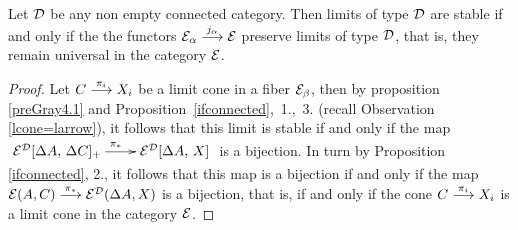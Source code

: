 \begin{proposition} \label{stable=preserve}
Let $\mathcal{D}$ be any non empty connected category. Then limits of type 
$\mathcal{D}$ are stable if and only if the  the functors 
$\mathcal{E}_\alpha \overset {j_\alpha} {\longrightarrow} \mathcal{E}$ preserve limits of type $\mathcal{D}$, that is, they remain universal in the category $\mathcal{E}$.
\end{proposition}
\begin{proof}
Let 
$C \overset {\pi_i} {\longrightarrow} X_i$ be a limit cone  
in a fiber $\mathcal{E}_\beta$, then by proposition \ref{preGray4.1} and  \mbox{Proposition \ref{ifconnected}, 1., 3.} 
(recall Observation \ref{lcone=larrow}), it follows that this limit is stable if and only if the map
$\xymatrix@C=5ex
   {
    \cc{E}^{\cc{D}}[\Delta A, \, \Delta C]_{+} 
    \ar[r]^{\pi_*}
   & \cc{E}^{\cc{D}}[\Delta A, \, X]
    }
$
is a bijection. 
In turn by Proposition \ref{ifconnected}, 2., it follows that this map is a bijection if and only if the map
$\mathcal{E}(A, C) \overset {\pi_*} {\longrightarrow} \mathcal{E}^\mathcal{D}(\Delta A, X)$ is a bijection, that is, if and only if the cone $C \overset {\pi_i} {\longrightarrow} X_i$ is a limit cone in the category $\mathcal{E}$.
\end{proof}
%
%
